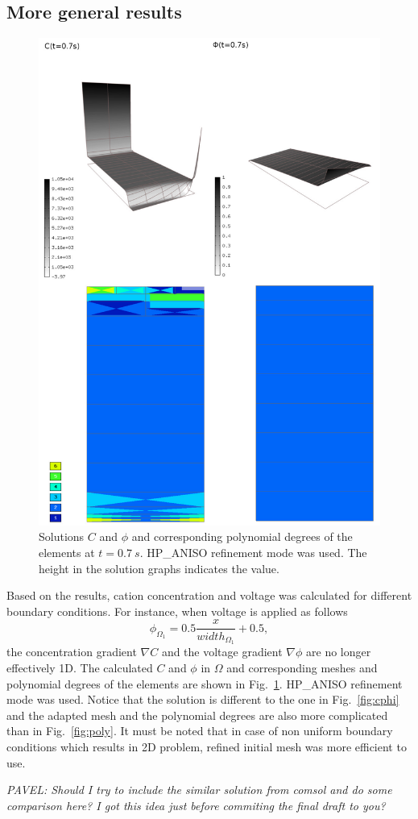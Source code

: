 \subsection{More general results}
\begin{figure}
  \begin{centering}
  \includegraphics[width=.75\columnwidth]{cphiorders}
  \caption{\label{fig:cphi-orders} Solutions $C$ and $\phi$
  and corresponding polynomial degrees of the elements at
  $t=0.7\ s$. HP\_ANISO refinement mode was used. The height
  in the solution graphs indicates the value.}
  \end{centering}
\end{figure}

Based on the results, cation concentration and voltage was calculated
for different boundary conditions.
For instance, when voltage is applied as follows
\begin{equation}
  \phi_{\Omega_1}=0.5\frac{x}{width_{\Omega_1}}+0.5,
\end{equation}
the concentration gradient $\nabla C$ and the voltage gradient $\nabla \phi$ are no
longer effectively 1D.
The calculated $C$ and $\phi$ in $\Omega$ and corresponding meshes and polynomial
degrees of the elements are shown in Fig.~\ref{fig:cphi-orders}.
HP\_ANISO refinement mode was used. Notice that the solution
is different to the one in Fig.~\ref{fig:cphi} and the adapted mesh and the
polynomial degrees are also more complicated than in Fig.~\ref{fig:poly}.
It must be noted that in case of non uniform boundary conditions which
results in 2D problem, refined initial mesh was more efficient to use.

\emph{
PAVEL: Should I try to include the similar solution from comsol and do
some comparison here? I got this idea just before commiting the final
draft to you?}
